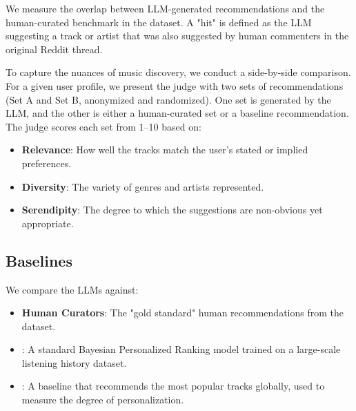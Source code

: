 We measure the overlap between LLM-generated recommendations and the human-curated benchmark in the \musicrs dataset. A "hit" is defined as the LLM suggesting a track or artist that was also suggested by human commenters in the original Reddit thread.

\para{\judge}
To capture the nuances of music discovery, we conduct a side-by-side comparison. For a given user profile, we present the judge with two sets of recommendations (Set A and Set B, anonymized and randomized). One set is generated by the LLM, and the other is either a human-curated set or a baseline recommendation. The judge scores each set from 1--10 based on:
\begin{itemize}[leftmargin=*,itemsep=0pt,topsep=0pt]
    \item {\bf Relevance}: How well the tracks match the user's stated or implied preferences.
    \item {\bf Diversity}: The variety of genres and artists represented.
    \item {\bf Serendipity}: The degree to which the suggestions are non-obvious yet appropriate.
\end{itemize}

\subsection{Baselines}

We compare the LLMs against:
\begin{itemize}[leftmargin=*,itemsep=0pt,topsep=0pt]
    \item {\bf Human Curators}: The "gold standard" human recommendations from the \musicrs dataset.
    \item {\bf \bpr \cite{rendle2012bpr}}: A standard Bayesian Personalized Ranking model trained on a large-scale listening history dataset.
    \item {\bf \popularity}: A baseline that recommends the most popular tracks globally, used to measure the degree of personalization.
\end{itemize}
